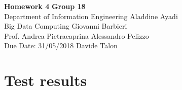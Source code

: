 \documentclass[a4paper, 11pt]{article}
\begin{document}
\noindent
\large\textbf{Homework 4} \hfill \textbf{Group 18} \\
\normalsize Department of Information Engineering \hfill Aladdine Ayadi\\
Big Data Computing \hfill Giovanni Barbieri\\
Prof. Andrea Pietracaprina \hfill Alessandro Pelizzo\\
Due Date: 31/05/2018 \hfill Davide Talon


\section*{Test results}
\lipsum[1]
\end{document}
